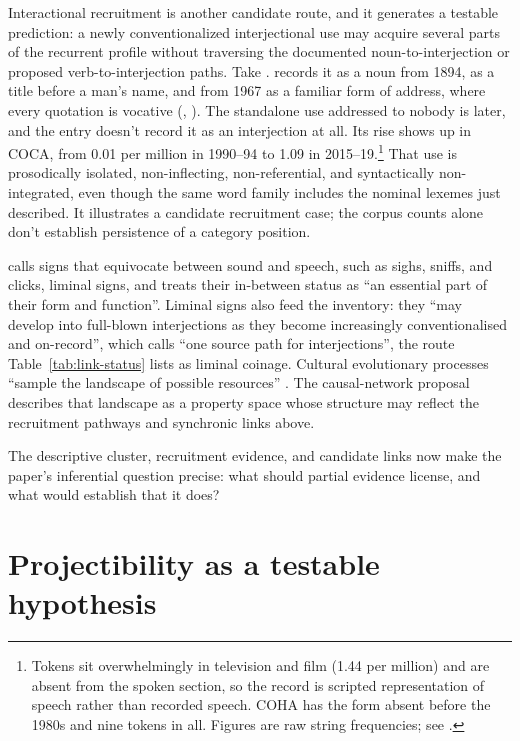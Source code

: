 \documentclass[12pt]{article}
\begin{document}
Interactional recruitment is another candidate route, and it generates a
testable prediction: a newly conventionalized interjectional
use may acquire several parts of the recurrent profile without traversing the
documented noun-to-interjection or proposed verb-to-interjection paths. Take
. \textcite{oed_bruh} records it as a noun from 1894, as a
title before a man's name, and from 1967 as a familiar form of address, where
every quotation is vocative (, ). The
standalone use addressed to nobody is later, and the entry doesn't record it as
an interjection at all. Its rise shows up in COCA, from 0.01 per million in
1990--94 to 1.09 in 2015--19.\footnote{Tokens sit overwhelmingly in television
  and film (1.44 per million) and are absent from the spoken section, so the
  record is scripted representation of speech rather than recorded speech. COHA
  has the form absent before the 1980s and nine tokens in all. Figures are raw
  string frequencies; see .} That use is
prosodically isolated, non-inflecting, non-referential, and syntactically
non-integrated, even though the same word family includes the nominal lexemes
just described. It illustrates a candidate recruitment case; the corpus counts
alone don't establish persistence of a category position.

\textcite[191]{dingemanse2020} calls signs that equivocate between sound and
speech, such as sighs, sniffs, and clicks, liminal signs, and treats their
in-between status as \enquote{an essential part of their form and function}.
Liminal signs also feed the inventory: they \enquote{may develop into
full-blown interjections as they become increasingly conventionalised and
on-record}, which \textcite[12]{dingemanse2023preprint} calls \enquote{one
source path for interjections}, the route Table~\ref{tab:link-status} lists as
liminal coinage.
Cultural evolutionary processes \enquote{sample
the landscape of possible resources} \citep[191]{dingemanse2020}. The
causal-network proposal describes that landscape as a property space whose
structure may reflect the recruitment pathways and synchronic links above.

The descriptive cluster, recruitment evidence, and candidate links now make
the paper's inferential question precise: what should partial evidence
license, and what would establish that it does?

\section[Projectibility]{Projectibility as a testable hypothesis}\label{sec:projectibility}
\end{document}
